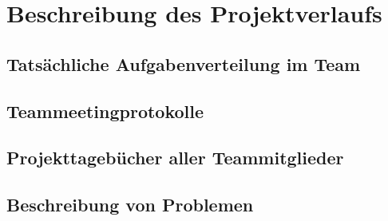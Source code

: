 \section{Beschreibung des Projektverlaufs}
\label{concept}

\subsection{Tatsächliche Aufgabenverteilung im Team}

\subsection{Teammeetingprotokolle}

\subsection{Projekttagebücher aller Teammitglieder}

\subsection{Beschreibung von Problemen}


